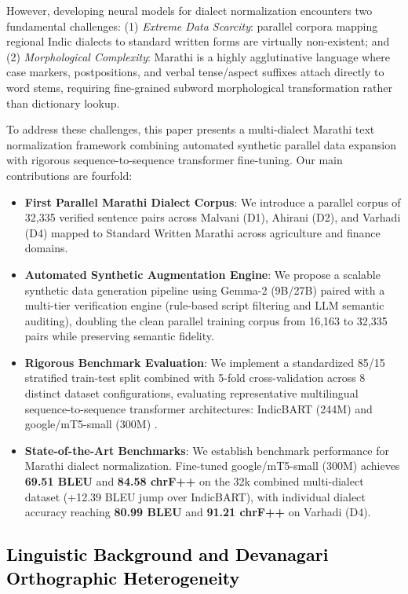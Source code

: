 However, developing neural models for dialect normalization encounters two fundamental challenges: (1) \textit{Extreme Data Scarcity}: parallel corpora mapping regional Indic dialects to standard written forms are virtually non-existent; and (2) \textit{Morphological Complexity}: Marathi is a highly agglutinative language where case markers, postpositions, and verbal tense/aspect suffixes attach directly to word stems, requiring fine-grained subword morphological transformation rather than dictionary lookup.

To address these challenges, this paper presents a multi-dialect Marathi text normalization framework combining automated synthetic parallel data expansion with rigorous sequence-to-sequence transformer fine-tuning. Our main contributions are fourfold:
\begin{itemize}
    \item \textbf{First Parallel Marathi Dialect Corpus}: We introduce a parallel corpus of 32,335 verified sentence pairs across Malvani (D1), Ahirani (D2), and Varhadi (D4) mapped to Standard Written Marathi across agriculture and finance domains.
    \item \textbf{Automated Synthetic Augmentation Engine}: We propose a scalable synthetic data generation pipeline using Gemma-2 (9B/27B) paired with a multi-tier verification engine (rule-based script filtering and LLM semantic auditing), doubling the clean parallel training corpus from 16,163 to 32,335 pairs while preserving semantic fidelity.
    \item \textbf{Rigorous Benchmark Evaluation}: We implement a standardized 85/15 stratified train-test split combined with 5-fold cross-validation across 8 distinct dataset configurations, evaluating representative multilingual sequence-to-sequence transformer architectures: IndicBART (244M) \cite{dabre2022indicbart} and google/mT5-small (300M) \cite{xue2021mt5}.
    \item \textbf{State-of-the-Art Benchmarks}: We establish benchmark performance for Marathi dialect normalization. Fine-tuned google/mT5-small (300M) achieves \textbf{69.51 BLEU} and \textbf{84.58 chrF++} on the 32k combined multi-dialect dataset (+12.39 BLEU jump over IndicBART), with individual dialect accuracy reaching \textbf{80.99 BLEU} and \textbf{91.21 chrF++} on Varhadi (D4).
\end{itemize}

\subsection{\textcolor{black}{Linguistic Background and Devanagari Orthographic Heterogeneity}}

